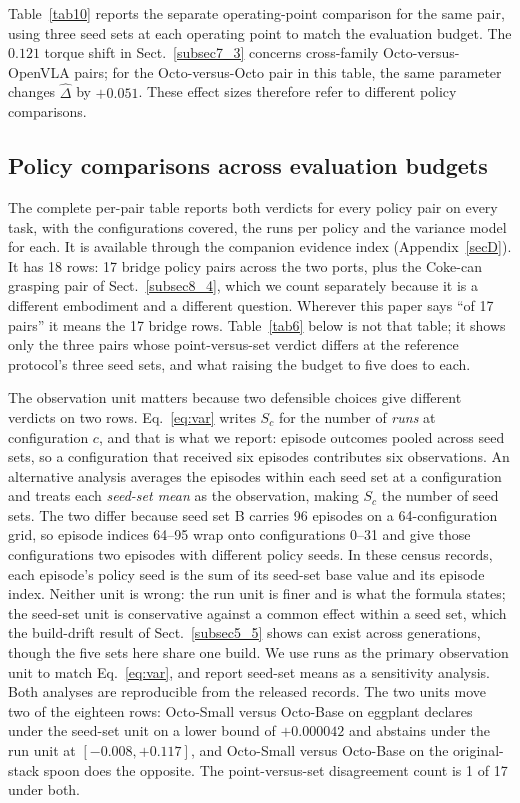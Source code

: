 \documentclass[pdflatex,iicol,sn-apa]{sn-jnl}
\theoremstyle{remark}
\begin{document}
Table~\ref{tab10} reports the separate operating-point comparison for the same pair, using
three seed sets at each operating point to match the evaluation budget. The $0.121$ torque
shift in Sect.~\ref{subsec7_3} concerns cross-family Octo-versus-OpenVLA pairs; for the
Octo-versus-Octo pair in this table, the same parameter changes $\hat\Delta$ by $+0.051$.
These effect sizes therefore refer to different policy comparisons.

\subsection{Policy comparisons across evaluation budgets}\label{subsec7_2}

The complete per-pair table reports both verdicts for every policy pair on every task, with the
configurations covered, the runs per policy and the variance model for each. It is
available through the companion evidence index (Appendix~\ref{secD}). It has 18
rows: 17 bridge policy pairs across the two ports, plus the Coke-can grasping pair of
Sect.~\ref{subsec8_4}, which we count separately because it is a different embodiment and a
different question. Wherever this paper says ``of 17 pairs'' it means the 17 bridge rows.
Table~\ref{tab6} below is not that table; it shows only the three pairs whose point-versus-set
verdict differs at the reference protocol's three seed sets, and what raising the budget to five
does to each.

The observation unit matters because two defensible choices give different verdicts on two rows. Eq.~\eqref{eq:var} writes $S_c$ for the number of \emph{runs} at
configuration $c$, and that is what we report: episode outcomes pooled across seed sets,
so a configuration that received six episodes contributes six observations. An alternative analysis averages the episodes within each seed set at a configuration and treats each
\emph{seed-set mean} as the observation, making $S_c$ the number of seed sets. The two differ
because seed set B carries 96 episodes on a 64-configuration grid, so episode indices 64--95 wrap onto
configurations 0--31 and give those configurations two episodes with different policy seeds.
In these census records, each episode's policy seed is the sum of its seed-set base value and its episode index. Neither unit is wrong: the run unit is
finer and is what the formula states; the seed-set unit is conservative against a common effect within a seed set, which the build-drift result of Sect.~\ref{subsec5_5} shows can exist across
generations, though the five sets here share one build. We use runs as the primary observation unit to match Eq.~\eqref{eq:var}, and report
seed-set means as a sensitivity analysis. Both analyses are reproducible from the released records. The two units move two
of the eighteen rows: Octo-Small versus Octo-Base on eggplant declares under the
seed-set unit on a lower bound of $+0.000042$ and abstains under the run unit at
$[-0.008, +0.117]$, and Octo-Small versus Octo-Base on the original-stack spoon does
the opposite. The point-versus-set disagreement count is 1 of 17 under both.
\end{document}
